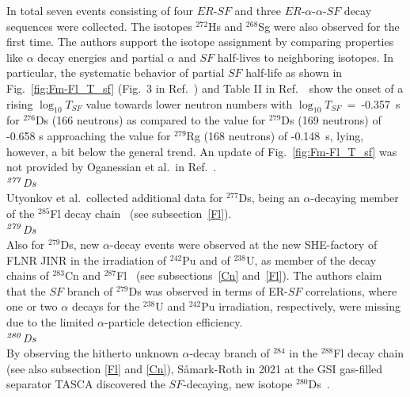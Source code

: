 In total seven events consisting of four $ER$-$SF$ and three $ER$-$\alpha$-$\alpha$-$SF$ decay sequences were collected.
The isotopes $^{272}$Hs and $^{268}$Sg were also observed for the first time.
The authors support the isotope assignment by comparing properties like $\alpha$ decay energies and partial $\alpha$ and $SF$ half-lives to neighboring isotopes. 
In particular, the systematic behavior of partial $SF$ half-life as shown in Fig.~\ref{fig:Fm-Fl_T_sf} (Fig.~3 in Ref.~\cite{Oganessian2022d}) and Table II in Ref.~\cite{Oganessian2022d}~show the onset of a rising $\log_{10} T_{SF}$ value towards lower neutron numbers with $\log_{10} T_{SF}$~=~-0.357~s for $^{276}$Ds (166 neutrons) as compared to the value for $^{279}$Ds (169 neutrons) of -0.658 s approaching the value for $^{279}$Rg (168 neutrons) of -0.148~s, lying, however, a bit below the general trend.
An update of Fig.~\ref{fig:Fm-Fl_T_sf} was not provided by Oganessian et al.~in Ref.~\cite{Oganessian2024}.\\


{\it $^{\it277}$Ds}\\
Utyonkov et al.~collected additional data for $^{277}$Ds, being an $\alpha$-decaying member of the $^{285}$Fl decay chain~\cite{Utyonkov2018} (see subsection~\ref{Fl}).\\

{\it $^{\it279}$Ds}\\
Also for $^{279}$Ds, new $\alpha$-decay events were observed at the new SHE-factory of FLNR JINR in the irradiation of $^{242}$Pu and of $^{238}$U, as member of the decay chains of $^{283}$Cn and $^{287}$Fl~\cite{Oganessian2022b} (see subsections~\ref{Cn} and~\ref{Fl}). 
The authors claim that the $SF$ branch of $^{279}$Ds was observed in terms of ER-$SF$ correlations, where one or two $\alpha$ decays for the $^{238}$U and $^{242}$Pu irradiation, respectively, were missing due to the limited $\alpha$-particle detection efficiency.    
\\


{\it $^{\it280}$Ds}\\
By observing the hitherto unknown $\alpha$-decay branch of $^{284}$ in the $^{288}$Fl decay chain (see also subsection \ref{Fl} and \ref{Cn}), S{\aa}mark-Roth in 2021 at the GSI gas-filled separator TASCA discovered the $SF$-decaying, new isotope $^{280}$Ds~\cite{Samark-Roth2021}.


